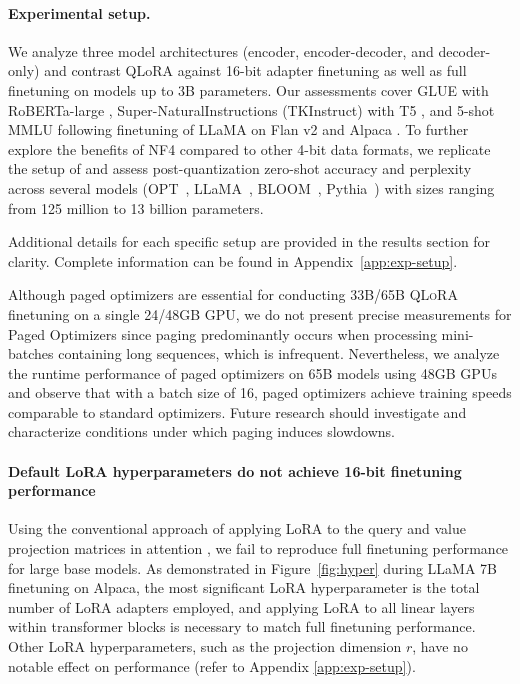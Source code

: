\paragraph{Experimental setup.} We analyze three model architectures (encoder, encoder-decoder, and decoder-only) and contrast QLoRA against 16-bit adapter finetuning as well as full finetuning on models up to 3B parameters. Our assessments cover GLUE \citep{wang2018glue} with RoBERTa-large \citep{liu2019roberta}, Super-NaturalInstructions (TKInstruct) \citep{wang2022super} with T5 \citep{t5}, and 5-shot MMLU \citep{hendrycksmeasuring} following finetuning of LLaMA on Flan v2 \citep{longpre2023flan} and Alpaca \citep{alpaca}. To further explore the benefits of NF4 compared to other 4-bit data formats, we replicate the setup of \citet{dettmers2022case} and assess post-quantization zero-shot accuracy and perplexity across several models (OPT~\citep{zhang2022opt}, LLaMA~\citep{touvron2023llama}, BLOOM~\citep{scao2022bloom}, Pythia~\citep{biderman2023pythia}) with sizes ranging from 125 million to 13 billion parameters.

Additional details for each specific setup are provided in the results section for clarity. Complete information can be found in Appendix~\ref{app:exp-setup}.

Although paged optimizers are essential for conducting 33B/65B \textsc{QLoRA} finetuning on a single 24/48GB GPU, we do not present precise measurements for Paged Optimizers since paging predominantly occurs when processing mini-batches containing long sequences, which is infrequent. Nevertheless, we analyze the runtime performance of paged optimizers on 65B models using 48GB GPUs and observe that with a batch size of 16, paged optimizers achieve training speeds comparable to standard optimizers. Future research should investigate and characterize conditions under which paging induces slowdowns.

\paragraph{Default LoRA hyperparameters do not achieve 16-bit finetuning performance}

Using the conventional approach of applying LoRA to the query and value projection matrices in attention \citep{hu2021lora}, we fail to reproduce full finetuning performance for large base models. As demonstrated in Figure~\ref{fig:hyper} during LLaMA 7B finetuning on Alpaca, the most significant LoRA hyperparameter is the total number of LoRA adapters employed, and applying LoRA to all linear layers within transformer blocks is necessary to match full finetuning performance. Other LoRA hyperparameters, such as the projection dimension $r$, have no notable effect on performance (refer to Appendix \ref{app:exp-setup}).

